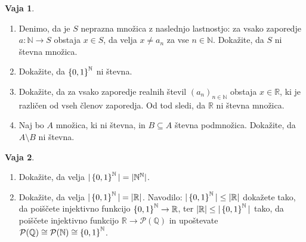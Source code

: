 \documentclass{article}
\newcommand{\pow}{\mathcal{P}}
\newcommand{\NN}{\mathbb{N}}
\newcommand{\QQ}{\mathbb{Q}}
\newcommand{\RR}{\mathbb{R}}
\theoremstyle{definition}
\newtheorem{vaja}{Vaja}
\begin{document}
\begin{vaja}
  \
  \begin{enumerate}
    \item
      Denimo, da je $S$ neprazna množica z naslednjo lastnostjo: za vsako zaporedje $a\colon \NN \to S$ obstaja $x \in S$, da velja $x \neq a_n$ za vse $n \in \NN$. Dokažite, da $S$ ni števna množica.
    \item
      Dokažite, da $\set{0,1}^\NN$ ni števna.
    \item
      Dokažite, da za vsako zaporedje realnih števil $(a_n)_{n \in \NN}$ obstaja $x \in \RR$, ki je različen od vseh členov zaporedja. Od tod sledi, da $\RR$ ni števna množica.
    \item
      Naj bo $A$ množica, ki ni števna, in $B \subseteq A$ števna podmnožica. Dokažite, da $A \setminus B$ ni števna.
  \end{enumerate}
\end{vaja}

\begin{vaja}
  \
  \begin{enumerate}
    \item
      Dokažite, da velja $|\set{0,1}^\NN| = |\NN^\NN|$.
    \item
      Dokažite, da velja $|\set{0,1}^\NN| = |\RR|$. Navodilo: $|\set{0,1}^\NN| \leq |\RR|$ dokažete tako, da poiščete injektivno funkcijo $\set{0,1}^\NN \to \RR$, ter $|\RR| \leq |\set{0,1}^\NN|$ tako, da poiščete injektivno funkcijo $\RR \to \pow(\QQ)$ in upoštevate $\pow(\QQ) \cong \pow(\NN) \cong \set{0,1}^\NN$.
  \end{enumerate}
\end{vaja}
\end{document}
